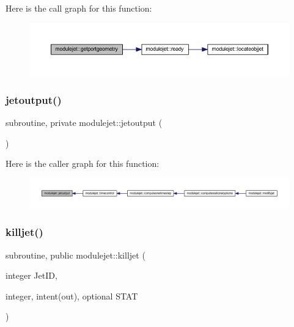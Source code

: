 Here is the call graph for this function\+:\nopagebreak
\begin{figure}[H]
\begin{center}
\leavevmode
\includegraphics[width=350pt]{namespacemodulejet_adcc462c38759f6ba6caa1b8f33479fa8_cgraph}
\end{center}
\end{figure}
\mbox{\label{namespacemodulejet_a200bdafc097359afe09ed14b7a55d8b7}} 
\subsubsection{\texorpdfstring{jetoutput()}{jetoutput()}}
{\footnotesize\ttfamily subroutine, private modulejet\+::jetoutput (\begin{DoxyParamCaption}{ }\end{DoxyParamCaption})\hspace{0.3cm}{\ttfamily [private]}}

Here is the caller graph for this function\+:\nopagebreak
\begin{figure}[H]
\begin{center}
\leavevmode
\includegraphics[width=350pt]{namespacemodulejet_a200bdafc097359afe09ed14b7a55d8b7_icgraph}
\end{center}
\end{figure}
\mbox{\label{namespacemodulejet_a98749a91e325a4b4041aa46d5abfde4e}} 
\subsubsection{\texorpdfstring{killjet()}{killjet()}}
{\footnotesize\ttfamily subroutine, public modulejet\+::killjet (\begin{DoxyParamCaption}\item[{integer}]{Jet\+ID,  }\item[{integer, intent(out), optional}]{S\+T\+AT }\end{DoxyParamCaption})}

